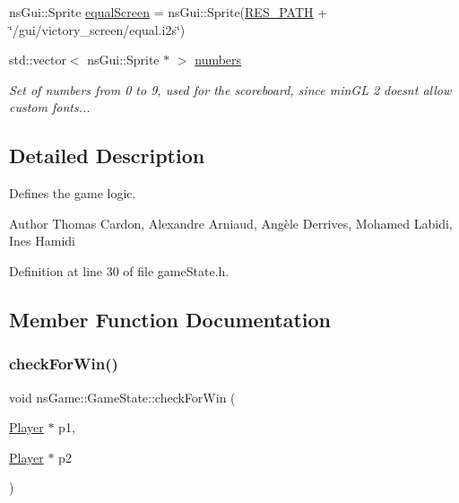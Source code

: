 \begin{DoxyCompactItemize}
ns\+Gui\+::\+Sprite \hyperlink{classns_game_1_1_game_state_aa0eafc52f02691494625a63ad62cf7db}{equal\+Screen} = ns\+Gui\+::\+Sprite(\hyperlink{definitions_8h_a793644bd88146828177a2a4f57e3bf01}{R\+E\+S\+\_\+\+P\+A\+TH} + \char`\"{}/gui/victory\+\_\+screen/equal.\+i2s\char`\"{})
\item 
std\+::vector$<$ ns\+Gui\+::\+Sprite $\ast$ $>$ \hyperlink{classns_game_1_1_game_state_a0b870e02f74c266d4a03dbe9210f7678}{numbers}
\begin{DoxyCompactList}\small\item\em Set of numbers from 0 to 9, used for the scoreboard, since min\+GL 2 doesn\textquotesingle{}t allow custom fonts... \end{DoxyCompactList}\end{DoxyCompactItemize}


\subsection{Detailed Description}
Defines the game logic. 

\begin{DoxyAuthor}{Author}
Thomas Cardon, Alexandre Arniaud, Angèle Derrives, Mohamed Labidi, Ines Hamidi 
\end{DoxyAuthor}


Definition at line 30 of file game\+State.\+h.



\subsection{Member Function Documentation}
\mbox{\label{classns_game_1_1_game_state_a78176e52c8f3c745bb88a4214f5aa29b}} 
\subsubsection{\texorpdfstring{check\+For\+Win()}{checkForWin()}}
{\footnotesize\ttfamily void ns\+Game\+::\+Game\+State\+::check\+For\+Win (\begin{DoxyParamCaption}\item[{\hyperlink{classns_game_1_1_player}{Player} $\ast$}]{p1,  }\item[{\hyperlink{classns_game_1_1_player}{Player} $\ast$}]{p2 }\end{DoxyParamCaption})}



